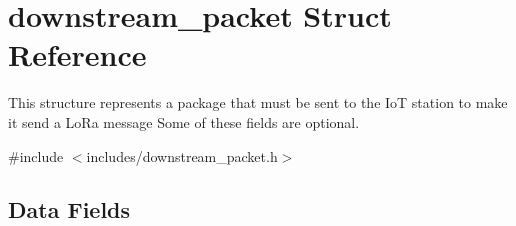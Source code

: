 \hypertarget{structdownstream__packet}{\section{downstream\-\_\-packet Struct Reference}
\label{structdownstream__packet}
}


This structure represents a package that must be sent to the Io\-T station to make it send a Lo\-Ra message Some of these fields are optional.  




{\ttfamily \#include $<$includes/downstream\-\_\-packet.\-h$>$}

\subsection*{Data Fields}
